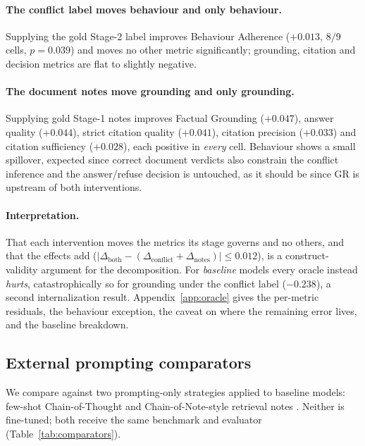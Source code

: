 \paragraph{The conflict label moves behaviour and only behaviour.} Supplying the
gold Stage-2 label improves Behaviour Adherence ($+0.013$, $8/9$ cells,
$p=0.039$) and moves no other metric significantly; grounding, citation and
decision metrics are flat to slightly negative.

\paragraph{The document notes move grounding and only grounding.} Supplying gold
Stage-1 notes improves Factual Grounding ($+0.047$), answer quality ($+0.044$),
strict citation quality ($+0.041$), citation precision ($+0.033$) and citation
sufficiency ($+0.028$), each positive in \emph{every} cell. Behaviour shows a
small spillover, expected since correct document verdicts also constrain the
conflict inference and the answer/refuse decision is untouched, as it should be
since GR is upstream of both interventions.

\paragraph{Interpretation.} That each intervention moves the metrics its stage
governs and no others, and that the effects add ($|\Delta_{\text{both}}-
(\Delta_{\text{conflict}}+\Delta_{\text{notes}})|\leq0.012$), is a
construct-validity argument for the decomposition. For \emph{baseline} models
every oracle instead \emph{hurts}, catastrophically so for grounding under the
conflict label ($-0.238$), a second internalization result.
Appendix~\ref{app:oracle} gives the per-metric residuals, the behaviour
exception, the caveat on where the remaining error lives, and the baseline
breakdown.

\subsection{External prompting comparators}
\label{sec:comparators}

We compare against two prompting-only strategies applied to baseline models:
few-shot Chain-of-Thought \citep{wei2022cot} and Chain-of-Note-style retrieval
notes \citep{yu2024chainofnote}. Neither is fine-tuned; both receive the same
benchmark and evaluator (Table~\ref{tab:comparators}).



